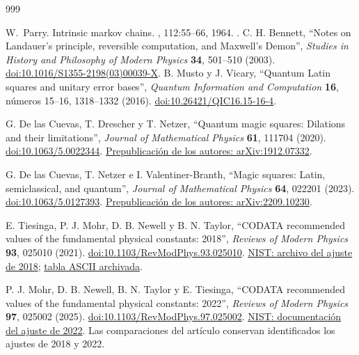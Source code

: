 \begin{thebibliography}{999}

W.~Parry.
\newblock Intrinsic markov chains.
, 112:55--66,
  1964.
\newblock \href {https://doi.org/10.1090/S0002-9947-1964-0161372-1}
  {}.
 C. H. Bennett, ``Notes on Landauer's principle,
reversible computation, and Maxwell's Demon'', \emph{Studies in History
and Philosophy of Modern Physics} \textbf{34}, 501--510 (2003).
\href{https://doi.org/10.1016/S1355-2198(03)00039-X}{doi:10.1016/S1355-2198(03)00039-X}.
B. Musto y J. Vicary,
``Quantum Latin squares and unitary error bases'',
\emph{Quantum Information and Computation} \textbf{16},
números 15--16, 1318--1332 (2016).
\href{https://doi.org/10.26421/QIC16.15-16-4}{doi:10.26421/QIC16.15-16-4}.

G. De las Cuevas, T. Drescher y T. Netzer,
``Quantum magic squares: Dilations and their limitations'',
\emph{Journal of Mathematical Physics} \textbf{61}, 111704 (2020).
\href{https://doi.org/10.1063/5.0022344}{doi:10.1063/5.0022344}.
\href{https://arxiv.org/abs/1912.07332}{Prepublicación de los autores: arXiv:1912.07332}.

G. De las Cuevas, T. Netzer e I. Valentiner-Branth,
``Magic squares: Latin, semiclassical, and quantum'',
\emph{Journal of Mathematical Physics} \textbf{64}, 022201 (2023).
\href{https://doi.org/10.1063/5.0127393}{doi:10.1063/5.0127393}.
\href{https://arxiv.org/abs/2209.10230}{Prepublicación de los autores: arXiv:2209.10230}.

E. Tiesinga, P. J. Mohr, D. B. Newell y B. N. Taylor,
``CODATA recommended values of the fundamental physical constants: 2018'',
\emph{Reviews of Modern Physics} \textbf{93}, 025010 (2021).
\href{https://doi.org/10.1103/RevModPhys.93.025010}{doi:10.1103/RevModPhys.93.025010}.
\href{https://physics.nist.gov/cuu/Constants/archive2018.html}{NIST: archivo del ajuste de 2018};
\href{https://physics.nist.gov/cuu/Constants/ArchiveASCII/allascii_2018.txt}{tabla ASCII archivada}.

P. J. Mohr, D. B. Newell, B. N. Taylor y E. Tiesinga,
``CODATA recommended values of the fundamental physical constants: 2022'',
\emph{Reviews of Modern Physics} \textbf{97}, 025002 (2025).
\href{https://doi.org/10.1103/RevModPhys.97.025002}{doi:10.1103/RevModPhys.97.025002}.
\href{https://physics.nist.gov/cuu/Constants/article2022.html}{NIST: documentación del ajuste de 2022}.
Las comparaciones del artículo conservan identificados los ajustes de 2018 y 2022.


\end{thebibliography}
